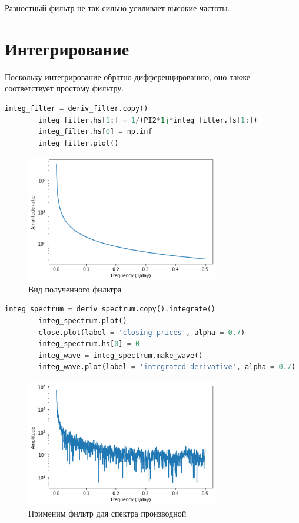 \documentclass[a4paper, 12pt]{report}
\begin{document}
	Разностный фильтр не так сильно усиливает высокие частоты.

	\chapter{Интегрирование}
	Поскольку интегрирование обратно дифференцированию, оно также соответствует простому фильтру.
	\begin{lstlisting}[language=Python,caption=Фильтр для интегрирования]
		integ_filter = deriv_filter.copy()
		integ_filter.hs[1:] = 1/(PI2*1j*integ_filter.fs[1:])
		integ_filter.hs[0] = np.inf
		integ_filter.plot()
	\end{lstlisting}
	\begin{figure}[H]
		\centering
		\includegraphics[width=0.75\textwidth]{int1.png}
		\caption{Вид полученного фильтра}
		\label{fig:int1}
	\end{figure}
	\begin{lstlisting}[language=Python,caption=Фильтр для интегрирования]
		integ_spectrum = deriv_spectrum.copy().integrate()
		integ_spectrum.plot()
		close.plot(label = 'closing prices', alpha = 0.7)
		integ_spectrum.hs[0] = 0
		integ_wave = integ_spectrum.make_wave()
		integ_wave.plot(label = 'integrated derivative', alpha = 0.7)
	\end{lstlisting}
		\begin{figure}[H]
		\centering
		\includegraphics[width=0.75\textwidth]{int2.png}
		\caption{Применим фильтр для спектра производной}
		\label{fig:int2}
	\end{figure}
\end{document}
